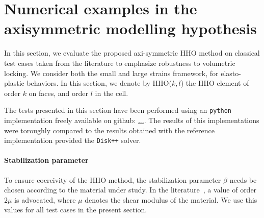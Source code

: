 

\section{Numerical examples in the axisymmetric modelling hypothesis}
\label{sec_numerical_examples}

In this section, we evaluate the proposed axi-symmetric HHO method on
classical test cases taken from the literature to emphasize robustness
to volumetric locking. We consider both the small and large strains
framework, for elasto-plastic behaviors. In this section, we denote by
HHO($k,l$) the HHO element of order $k$ on faces, and order $l$ in the
cell.

The tests presented in this section have been performed using an
\texttt{python} implementation freely available on github: \url{...}.
The results of this implementations were toroughly compared to the
results obtained with the reference implementation provided the
\texttt{Disk++} solver.

\paragraph{Stabilization parameter}

To ensure coercivity of the HHO method, the stabilization parameter
$\beta$ needs be chosen according to the material under study. In the
literature~\cite{di_pietro_discontinuous-skeletal_2015}, a value of
order $2 \mu$ is advocated, where $\mu$ denotes the shear modulus of the
material. We use this values for all test cases in the present section.

